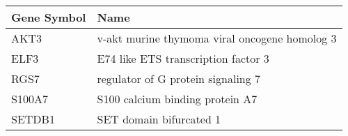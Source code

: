 \begin{tabular}{ll}
\toprule
Gene Symbol &                                          Name \\
\midrule
       AKT3 & v-akt murine thymoma viral oncogene homolog 3 \\
       ELF3 &           E74 like ETS transcription factor 3 \\
       RGS7 &            regulator of G protein signaling 7 \\
     S100A7 &               S100 calcium binding protein A7 \\
     SETDB1 &                       SET domain bifurcated 1 \\
\bottomrule
\end{tabular}
